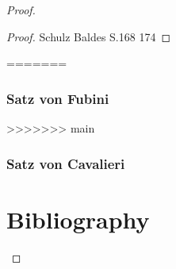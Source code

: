 \documentclass[letterpaper,10pt,english]{jupyterBook}
\begin{document}
\begin{proof}
\begin{proof}
 Schulz Baldes S.168 174
\end{proof}
=======

\subsection{Satz von Fubini}
\label{\detokenize{masstheorie/integrationstechnik:satz-von-fubini}}
>>>>>>> main

\subsection{Satz von Cavalieri}
\label{\detokenize{masstheorie/integrationstechnik:satz-von-cavalieri}}

\chapter{Bibliography}
\label{\detokenize{references:bibliography}}\label{\detokenize{references::doc}}
\par



\end{proof}
\end{document}
